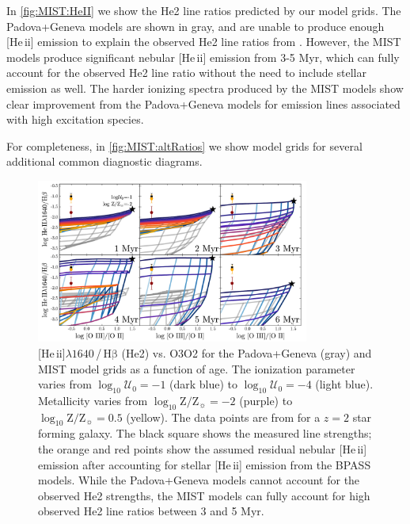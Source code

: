 \documentclass[twocolumn, tighten]{aastex61}
\newcommand{\Fig}[1]{\autoref{fig:#1}}
\newcommand{\logten}{\ensuremath{\log_{10}}}
\newcommand{\heii}{[He\,{\sc ii}]\xspace}
\newcommand{\hb}{\ensuremath{\mathrm{H\beta}}}
\newcommand\lam[1]{\ensuremath{\lambda #1}}
\newcommand{\logZeq}[1]{\ensuremath{\logten \mathrm{Z}/\mathrm{Z}_{\sun} = #1}}
\newcommand{\logU}{\ensuremath{\logten \mathcal{U}_0}}
\begin{document}
In \Fig{MIST:HeII} we show the He2 line ratios predicted by our model grids. The Padova+Geneva models are shown in gray, and are unable to produce enough \heii emission to explain the observed He2 line ratios from \citet{Steidel16}. However, the MIST models produce significant nebular \heii emission from 3-5 Myr, which can fully account for the observed He2 line ratio without the need to include stellar emission as well. The harder ionizing spectra produced by the MIST models show clear improvement from the Padova+Geneva models for emission lines associated with high excitation species.

For completeness, in \Fig{MIST:altRatios} we show model grids for several additional common diagnostic diagrams. 
\begin{figure}
  \begin{centering}
    \includegraphics[width=0.8\textwidth]{f23.pdf}
    \caption{\heii\lam{1640}\,/\,\hb{} (He2) vs. O3O2 for the Padova+Geneva (gray) and MIST model grids as a function of age. The ionization parameter varies from $\logU{}=-1$ (dark blue) to $\logU{}=-4$ (light blue). Metallicity varies from \logZeq{-2} (purple) to \logZeq{0.5} (yellow). The data points are from \citet{Steidel16} for a $z=2$ star forming galaxy. The black square shows the measured line strengths; the orange and red points show the assumed residual nebular \heii{} emission after accounting for stellar \heii{} emission from the BPASS models. While the Padova+Geneva models cannot account for the observed He2 strengths, the MIST models can fully account for high observed He2 line ratios between 3 and 5 Myr.}
    \label{fig:MIST:HeII}
  \end{centering}
\end{figure}
\end{document}

